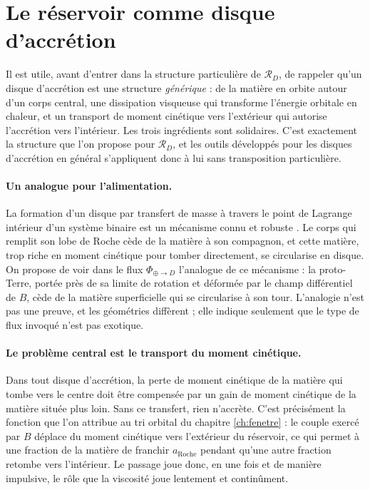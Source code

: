 \documentclass[11pt,a4paper,openany]{report}
\newcommand{\aR}{a_{\mathrm{Roche}}}
\newcommand{\RD}{\mathcal{R}_{D}}
\begin{document}

\section{Le réservoir comme disque d'accrétion}
\label{sec:disque-accretion}

Il est utile, avant d'entrer dans la structure particulière de $\RD$, de rappeler qu'un disque
d'accrétion est une structure \emph{générique} : de la matière en orbite autour d'un corps central,
une dissipation visqueuse qui transforme l'énergie orbitale en chaleur, et un transport de moment
cinétique vers l'extérieur qui autorise l'accrétion vers l'intérieur. Les trois ingrédients sont
solidaires. C'est exactement la structure que l'on propose pour $\RD$, et les outils développés pour
les disques d'accrétion en général \cite{ShakuraSunyaev1973,Pringle1981,FrankKingRaine2002}
s'appliquent donc à lui sans transposition particulière.

\paragraph{Un analogue pour l'alimentation.} La formation d'un disque par transfert de masse à
travers le point de Lagrange intérieur d'un système binaire est un mécanisme connu et robuste
\cite{FrankKingRaine2002}. Le corps qui remplit son lobe de Roche cède de la matière à son
compagnon, et cette matière, trop riche en moment cinétique pour tomber directement, se circularise
en disque. On propose de voir dans le flux $\Phi_{\oplus\to D}$ l'analogue de ce mécanisme : la
proto-Terre, portée près de sa limite de rotation et déformée par le champ différentiel de $B$,
cède de la matière superficielle qui se circularise à son tour. L'analogie n'est pas une preuve, et
les géométries diffèrent ; elle indique seulement que le type de flux invoqué n'est pas exotique.

\paragraph{Le problème central est le transport du moment cinétique.} Dans tout disque
d'accrétion, la perte de moment cinétique de la matière qui tombe vers le centre doit être
compensée par un gain de moment cinétique de la matière située plus loin. Sans ce transfert, rien
n'accrète. C'est précisément la fonction que l'on attribue au tri orbital du chapitre
\ref{ch:fenetre} : le couple exercé par $B$ déplace du moment cinétique vers l'extérieur du
réservoir, ce qui permet à une fraction de la matière de franchir $\aR$ pendant qu'une autre
fraction retombe vers l'intérieur. Le passage joue donc, en une fois et de manière impulsive, le
rôle que la viscosité joue lentement et continûment.
\end{document}
